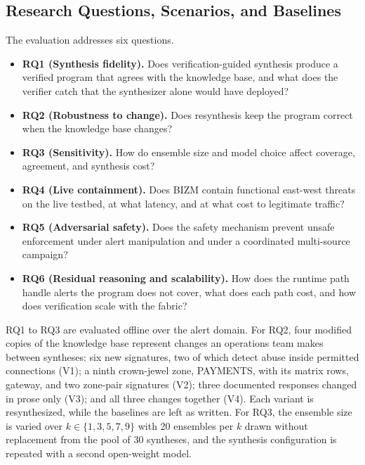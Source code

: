 \documentclass[final,5p]{elsarticle}
\begin{document}
\subsection{Research Questions, Scenarios, and Baselines}
\label{sec:scenarios_baselines}

The evaluation addresses six questions.
\begin{itemize}[leftmargin=*]
    \item \textbf{RQ1 (Synthesis fidelity).} Does verification-guided synthesis produce a verified program that agrees with the knowledge base, and what does the verifier catch that the synthesizer alone would have deployed?
    \item \textbf{RQ2 (Robustness to change).} Does resynthesis keep the program correct when the knowledge base changes?
    \item \textbf{RQ3 (Sensitivity).} How do ensemble size and model choice affect coverage, agreement, and synthesis cost?
    \item \textbf{RQ4 (Live containment).} Does BIZM contain functional east-west threats on the live testbed, at what latency, and at what cost to legitimate traffic?
    \item \textbf{RQ5 (Adversarial safety).} Does the safety mechanism prevent unsafe enforcement under alert manipulation and under a coordinated multi-source campaign?
    \item \textbf{RQ6 (Residual reasoning and scalability).} How does the runtime path handle alerts the program does not cover, what does each path cost, and how does verification scale with the fabric?
\end{itemize}

RQ1 to RQ3 are evaluated offline over the alert domain. For RQ2, four modified copies of the knowledge base represent changes an operations team makes between syntheses: six new signatures, two of which detect abuse inside permitted connections (V1); a ninth crown-jewel zone, PAYMENTS, with its matrix rows, gateway, and two zone-pair signatures (V2); three documented responses changed in prose only (V3); and all three changes together (V4). Each variant is resynthesized, while the baselines are left as written. For RQ3, the ensemble size is varied over $k\in\{1,3,5,7,9\}$ with 20 ensembles per $k$ drawn without replacement from the pool of 30 syntheses, and the synthesis configuration is repeated with a second open-weight model.
\end{document}
